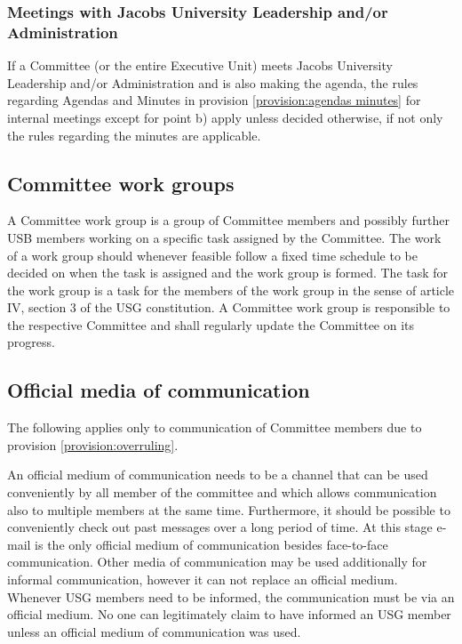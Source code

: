 \subsubsection{Meetings with Jacobs University Leadership and/or Administration}
  If a Committee (or the entire Executive Unit) meets Jacobs University Leadership and/or Administration and is also making the agenda, the rules regarding Agendas and Minutes in provision \ref{provision:agendas minutes} for internal meetings except for point b) apply unless decided otherwise, if not only the rules regarding the minutes are applicable. 

\subsection[Work groups]{Committee work groups}
A Committee work group is a group of Committee members and possibly further USB members working on a specific task assigned by the Committee. The work of a work group should whenever feasible follow a fixed time schedule to be decided on when the task is assigned and the work group is formed. The task for the work group is a task for the members of the work group in the sense of article IV, section 3 of the USG constitution. 
A Committee work group is responsible to the respective Committee and shall regularly update the Committee on its progress. %

\subsection{Official media of communication}
The following applies only to communication of Committee members due to provision \ref{provision:overruling}.

An official medium of communication needs to be a channel that can be used conveniently by all member of the committee and which allows communication also to multiple members at the same time. Furthermore, it should be possible to conveniently check out past messages over a long period of time. At this stage e-mail is the only official medium of communication besides face-to-face communication. 
Other media of communication may be used additionally for informal communication, however it can not replace an official medium. Whenever USG members need to be informed, the communication must be via an official medium. No one can legitimately claim to have informed an USG member unless an official medium of communication was used. 

